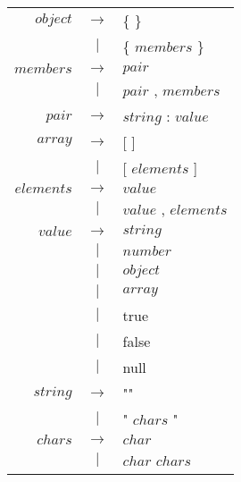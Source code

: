 \documentclass{article}
\begin{document}
\begin{tabular}{ r c l }
$object$	& $ \rightarrow $ 	& \{ \}				\\
 		& $ | $			& \{ $members$ \} 		\\
$members$ 	& $ \rightarrow $	& $pair$			\\
		& $ | $			& $pair$ , $members$ 		\\
$pair$		& $ \rightarrow $	& $string$ : $value$ 		\\
$array$		& $ \rightarrow $	& [ ]				\\
		& $ | $			& [ $elements$ ]		\\
$elements$ 	& $ \rightarrow $	& $value$			\\
		& $ | $			& $value$ , $elements$		\\
$value$		& $ \rightarrow $	& $string$			\\
		& $ | $			& $number$			\\
		& $ | $			& $object$			\\
		& $ | $			& $array$			\\
		& $ | $			& true				\\
		& $ | $			& false				\\
		& $ | $			& null				\\
$string$	& $ \rightarrow $	& ""				\\
		& $ | $			& " $chars$ "			\\
$chars$		& $ \rightarrow $	& $char$			\\
		& $ | $			& $char$ $chars$		\\


\end{tabular}
\end{document}
